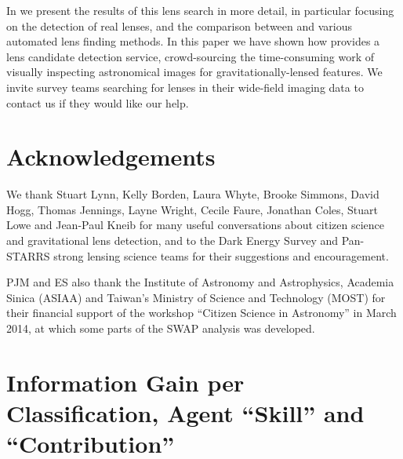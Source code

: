 \documentclass[useAMS,usenatbib,a4paper]{mn2e}
\begin{document}
In \PaperTwo we present the results of this \cfhtls lens search in more detail,
in particular focusing on the detection of real lenses, and the comparison
between \SW and various automated lens finding methods. In this paper  we have
shown how \SW provides a lens candidate detection service, crowd-sourcing the
time-consuming work of visually inspecting astronomical images for
gravitationally-lensed features. We invite survey teams searching for lenses in
their wide-field imaging data to contact us if they would like our help.



\section*{Acknowledgements}

We thank Stuart Lynn, Kelly Borden, Laura Whyte, Brooke Simmons,
David Hogg, Thomas Jennings, Layne  Wright, Cecile Faure, Jonathan Coles, Stuart
Lowe and Jean-Paul Kneib for many useful conversations about citizen science and
gravitational lens detection, and to the Dark Energy Survey and Pan-STARRS strong
lensing science teams for their suggestions and encouragement.

PJM and ES also thank the Institute of Astronomy and Astrophysics, Academia Sinica
(ASIAA) and Taiwan's Ministry of Science and Technology (MOST) for their
financial support of the workshop ``Citizen Science in Astronomy'' in March
2014, at which some parts of the SWAP analysis was developed.









\appendix


\section{Information Gain per Classification, Agent ``Skill'' and ``Contribution''}
\label{appendix:swap}
\end{document}
